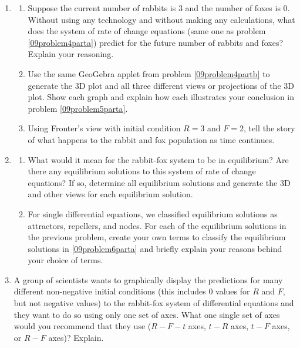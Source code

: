 \begin{enumerate}[resume]
\clearpage
\item \label{09problem5}	\begin{enumerate}
\item Suppose the current number of rabbits is 3 and the number of foxes is 0. Without using any technology and without making any calculations, what does the system of rate of change equations (same one as problem \ref{09problem4parta}) predict for the future number of rabbits and foxes? Explain your reasoning. \label{09problem5parta}
\vfill
\item Use the same GeoGebra applet from problem \ref{09problem4partb} to generate the 3D plot and all three different views or projections of the 3D plot. Show each graph and explain how each illustrates your conclusion in problem \ref{09problem5parta}. \label{09problem5partb}
\vfill
\item Using Fronter's view with initial condition $R = 3$ and $F = 2$, tell the story of what happens to the rabbit and fox population as time continues. \label{09problem5partc}
\vfill
\end{enumerate} 

\item \label{09problem6}
\begin{enumerate}
\item  What would it mean for the rabbit-fox system to be in equilibrium? Are there any equilibrium solutions to this system of rate of change equations? If so, determine all equilibrium solutions and generate the 3D and other views for each equilibrium solution. \label{09problem6parta}
\vfill

\item For single differential equations, we classified equilibrium solutions as attractors, repellers, and nodes.  For each of the equilibrium solutions in the previous problem, create your own terms to classify the equilibrium solutions in \ref{09problem6parta} and briefly explain your reasons behind your choice of terms. \label{09problem6partb}
\vfill
\end{enumerate}

\clearpage
\item A group of scientists wants to graphically display the predictions for many different non-negative initial conditions (this includes 0 values for $R$ and $F$, but not negative values) to the rabbit-fox system of differential equations and they want to do so using only one set of axes. What one single set of axes would you recommend that they use ($R-F-t$ axes, $t-R$ axes, $t-F$ axes, or $R-F$ axes)? Explain. \label{09problem7} \vfill


\end{enumerate}
